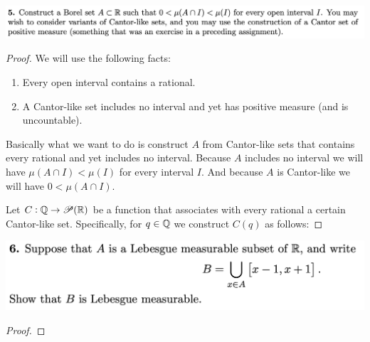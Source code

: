 \newpage
\begin{mdframed}
\includegraphics[width=400pt]{img/analysis--berkeley-202a-hw05-40cd.png}
\end{mdframed}

\begin{proof}
  We will use the following facts:
  \begin{enumerate}
  \item Every open interval contains a rational.
  \item A Cantor-like set includes no interval and yet has positive measure (and is uncountable).
  \end{enumerate}

  Basically what we want to do is construct $A$ from Cantor-like sets that contains every rational and yet
  includes no interval. Because $A$ includes no interval we will have $\mu(A \cap I) < \mu(I)$ for every
  interval $I$. And because $A$ is Cantor-like we will have $0 < \mu(A \cap I)$.

  Let $C: \mathbb{Q} \to \mathscr{P}(\mathbb{R})$ be a function that associates with every rational a certain Cantor-like set.
  Specifically, for $q \in \mathbb{Q}$ we construct $C(q)$ as follows:

\end{proof}

\newpage
\begin{mdframed}
\includegraphics[width=400pt]{img/analysis--berkeley-202a-hw05-3d2c.png}
\end{mdframed}

\begin{proof}

\end{proof}